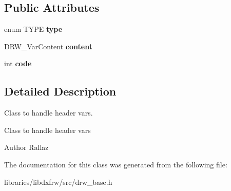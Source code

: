 \subsection*{Public Attributes}
\begin{DoxyCompactItemize}
\item 
\hypertarget{classDRW__Variant_a6ec337a6e0ae84e609b084e837970820}{enum T\-Y\-P\-E {\bfseries type}}\label{classDRW__Variant_a6ec337a6e0ae84e609b084e837970820}

\item 
\hypertarget{classDRW__Variant_ac15c4b3c8417bdcc616fe1599b998c46}{D\-R\-W\-\_\-\-Var\-Content {\bfseries content}}\label{classDRW__Variant_ac15c4b3c8417bdcc616fe1599b998c46}

\item 
\hypertarget{classDRW__Variant_ae5a8f7fa02e3c751999b3cca9f2af9eb}{int {\bfseries code}}\label{classDRW__Variant_ae5a8f7fa02e3c751999b3cca9f2af9eb}

\end{DoxyCompactItemize}


\subsection{Detailed Description}
Class to handle header vars. 

Class to handle header vars \begin{DoxyAuthor}{Author}
Rallaz 
\end{DoxyAuthor}


The documentation for this class was generated from the following file\-:\begin{DoxyCompactItemize}
\item 
libraries/libdxfrw/src/drw\-\_\-base.\-h\end{DoxyCompactItemize}
